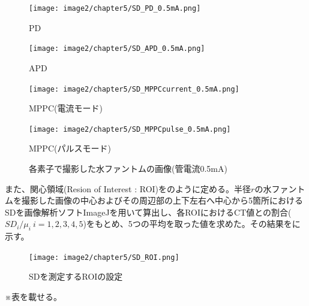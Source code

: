 \begin{figure}[H]
 \begin{minipage}{0.5\hsize}
  \begin{center}
   \texttt{[image: image2/chapter5/SD\_PD\_0.5mA.png]} 
  \end{center}
  \vspace{-1cm}
  \caption*{PD}
 \end{minipage}
 \begin{minipage}{0.5\hsize}
  \begin{center}
 \texttt{[image: image2/chapter5/SD\_APD\_0.5mA.png]} 
  \end{center}
  \vspace{-1cm}
  \caption*{APD}
 \end{minipage}
  \begin{minipage}{0.5\hsize}
  \begin{center}
 \texttt{[image: image2/chapter5/SD\_MPPCcurrent\_0.5mA.png]} 
  \end{center}
  \vspace{-1cm}
  \caption*{MPPC(電流モード)}
 \end{minipage}
  \begin{minipage}{0.5\hsize}
  \begin{center}
 \texttt{[image: image2/chapter5/SD\_MPPCpulse\_0.5mA.png]} 
  \end{center}
  \vspace{-1cm}
  \caption*{MPPC(パルスモード)}
 \end{minipage}
 \begin{center}
  \caption{各素子で撮影した水ファントムの画像(管電流0.5mA)}
  \label{fig:SD_result}
  \end{center}
\end{figure}

また、関心領域(Resion of Interest : ROI)をのように定める。半径$r$の水ファントムを撮影した画像の中心およびその周辺部の上下左右へ中心から5箇所におけるSDを画像解析ソフトImageJを用いて算出し、各ROIにおけるCT値との割合($SD_i/\mu_i\ i=1,2,3,4,5$)をもとめ、5つの平均を取った値を求めた。その結果をに示す。

\begin{figure}[H]
 \begin{center}
 \texttt{[image: image2/chapter5/SD\_ROI.png]} 
 \end{center}
 \caption{SDを測定するROIの設定}
 \label{fig:SD_ROI}
\end{figure}


※表を載せる。\\


